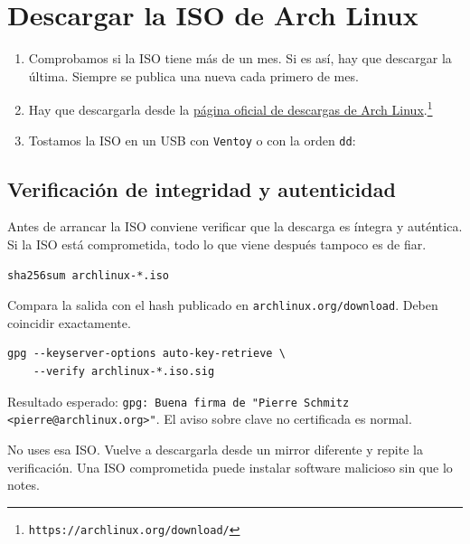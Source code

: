 \section{Descargar la ISO de Arch Linux}
\begin{enumerate}
  \item Comprobamos si la ISO tiene más de un mes. Si es así, hay que descargar la última. Siempre se publica una nueva cada
        primero de mes.
  \item Hay que descargarla desde la \href{https://archlinux.org/download/}{página oficial de descargas de Arch Linux}.\footnote{\texttt{https://archlinux.org/download/}}
  \item Tostamos la ISO en un USB con \texttt{Ventoy} o con la orden \texttt{dd}:
    \begin{tcolorbox}[title=Ejemplo con \texttt{dd} (sustituir \texttt{/dev/sdX} por el dispositivo real)]
    \end{tcolorbox}
\end{enumerate}

\subsection{Verificación de integridad y autenticidad}

Antes de arrancar la ISO conviene verificar que la descarga es íntegra y auténtica.
Si la ISO está comprometida, todo lo que viene después tampoco es de fiar.

\begin{tcolorbox}[title=Verificar el hash SHA256]
\begin{lstlisting}[style=bashstyle]
sha256sum archlinux-*.iso
\end{lstlisting}
\tcblower
\scriptsize Compara la salida con el hash publicado en \texttt{archlinux.org/download}. Deben coincidir exactamente.
\end{tcolorbox}

\begin{tcolorbox}[title=Verificar la firma GPG]
\begin{lstlisting}[style=bashstyle]
gpg --keyserver-options auto-key-retrieve \
    --verify archlinux-*.iso.sig
\end{lstlisting}
\tcblower
\scriptsize Resultado esperado: \texttt{gpg: Buena firma de "Pierre Schmitz <pierre@archlinux.org>"}. El aviso sobre clave no certificada es normal.
\end{tcolorbox}

\begin{tcolorbox}[colback=red!5, colframe=red!70!black, title={\color{red}\textbf{Si el hash o la firma no coinciden}}]
No uses esa ISO. Vuelve a descargarla desde un mirror diferente y repite la verificación. Una ISO comprometida puede instalar software malicioso sin que lo notes.
\end{tcolorbox}
